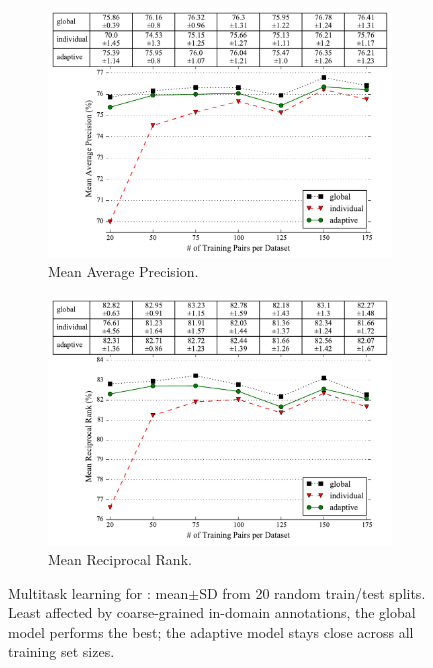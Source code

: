 \begin{figure}
    \begin{subfigure}[b]{0.5\textwidth}
        \includegraphics[scale=0.47]{2016_naacl_stsdomain/figures/asr_multitask_learning_maps.pdf}
        \caption{Mean Average Precision.}
        \label{figure:asr-multitask-learning-maps}
    \end{subfigure}
    
    
    \begin{subfigure}[b]{0.45\textwidth}
        \includegraphics[scale=0.47]{2016_naacl_stsdomain/figures/asr_multitask_learning_mrrs.pdf}
        \caption{Mean Reciprocal Rank.}
        \label{figure:asr-multitask-learning-mrrs}
    \end{subfigure}
    \newline
    \caption{Multitask learning for \asr{}: mean$\pm$SD from 20 random train/test splits.
    Least affected by coarse-grained in-domain annotations, the
    global model performs the best; the adaptive model
    stays close across all training set sizes.}
    \label{figure:asr-mtl-results}
\end{figure}



